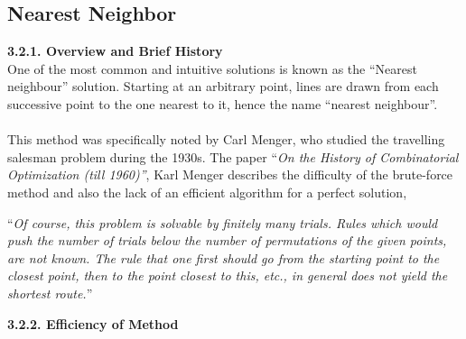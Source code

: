 \documentclass{article}
\begin{document}
\subsection{Nearest Neighbor}     %

\textbf{3.2.1. Overview and Brief History}
\\One of the most common and intuitive solutions is known as the “Nearest neighbour” solution. Starting at an arbitrary point, lines are drawn from each successive point to the one nearest to it, hence the name “nearest neighbour”. 
\\
\\This method was specifically noted by Carl Menger, who studied the travelling salesman problem during the 1930s. The paper “\textit{On the History of Combinatorial Optimization (till 1960)”}, Karl Menger describes the difficulty of the brute-force method and also the lack of an efficient algorithm for a perfect solution, 
\\
\begin{center}
    “\textit{Of course, this problem is solvable by finitely many trials. Rules which would push the number of trials below the number of permutations of the given points, are not known. The rule that one first should go from the starting point to the closest point, then to the point closest to this, etc., in general does not yield the shortest route.}”
\end{center}

\cite{Schrijver1960}


\textbf{3.2.2. Efficiency of Method}
\end{document}
